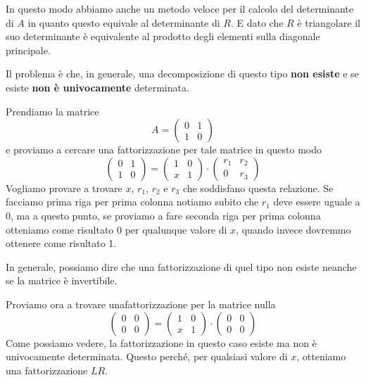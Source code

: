 \begin{observation}
	In questo modo abbiamo anche un metodo veloce per il calcolo del determinante di $A$ in quanto questo equivale
	al determinante di $R$. E dato che $R$ è triangolare il suo determinante è equivalente al prodotto degli
	elementi sulla diagonale principale.
\end{observation}

Il problema è che, in generale, una decomposizione di questo tipo \textbf{non esiste} e se esiste
\textbf{non è univocamente} determinata.

\begin{example}
	Prendiamo la matrice
	\[
		A  = \begin{pmatrix}
			0 & 1 \\
			1 & 0
		\end{pmatrix}
	\]
	e proviamo a cercare una fattorizzazione per tale matrice in questo modo
	\[
		\begin{pmatrix}
			0 & 1 \\
			1 & 0
		\end{pmatrix} =
		\begin{pmatrix}
			1 & 0 \\
			x & 1
		\end{pmatrix} \cdot
		\begin{pmatrix}
			r_1 & r_2 \\
			0   & r_3
		\end{pmatrix}
	\]
	Vogliamo provare a trovare $x$, $r_1$, $r_2$ e $r_3$ che soddisfano questa relazione. Se facciamo prima riga
	per prima colonna notiamo subito che $r_1$ deve essere uguale a 0, ma a questo punto, se proviamo a fare
	seconda riga per prima colonna otteniamo come risultato 0 per qualunque valore di $x$, quando invece dovremmo
	ottenere come risultato 1.
\end{example}

In generale, possiamo dire che una fattorizzazione di quel tipo non esiste neanche se la matrice è invertibile.

\begin{example}
	Proviamo ora a trovare unafattorizzazione per la matrice nulla
	\[
		\begin{pmatrix}
			0 & 0 \\
			0 & 0
		\end{pmatrix} =
		\begin{pmatrix}
			1 & 0 \\
			x & 1
		\end{pmatrix} \cdot
		\begin{pmatrix}
			0 & 0 \\
			0 & 0
		\end{pmatrix}
	\]
	Come possiamo vedere, la fattorizzazione in questo caso esiste ma non è univocamente determinata. Questo
	perché, per qualsiasi valore di $x$, otteniamo una fattorizzazione $LR$.
\end{example}

